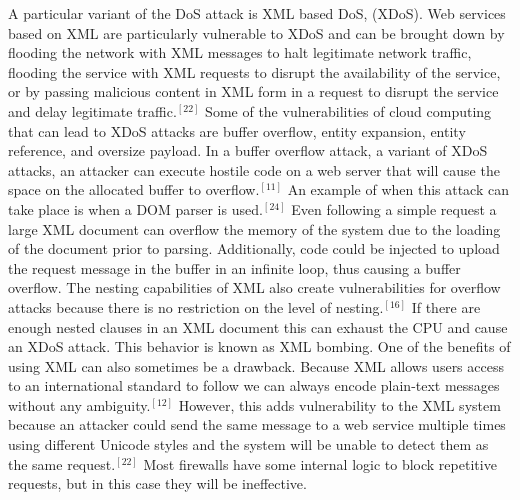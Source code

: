 \documentclass[a4paper, 8pt]{article} %
\begin{document}
\begin{doublespacing}
A particular variant of the DoS attack is XML based DoS, (XDoS).  Web services based on XML are particularly vulnerable to XDoS and can be brought down by flooding the network with XML messages to halt legitimate network traffic, flooding the service with XML requests to disrupt the availability of the service, or by passing malicious content in XML form in a request to disrupt the service and delay legitimate traffic.$^{[22]}$  Some of the vulnerabilities of cloud computing that can lead to XDoS attacks are buffer overflow, entity expansion, entity reference, and oversize payload.  In a buffer overflow attack, a variant of XDoS attacks, an attacker can execute hostile code on a web server that will cause the space on the allocated buffer to overflow.$^{[11]}$  An example of when this attack can take place is when a DOM parser is used.$^{[24]}$  Even following a simple request a large XML document can overflow the memory of the system due to the loading of the document prior to parsing.  Additionally, code could be injected to upload the request message in the buffer in an infinite loop, thus causing a buffer overflow.  The nesting capabilities of XML also create vulnerabilities for overflow attacks because there is no restriction on the level of nesting.$^{[16]}$  If there are enough nested clauses in an XML document this can exhaust the CPU and cause an XDoS attack.  This behavior is known as XML bombing.  One of the benefits of using XML can also sometimes be a drawback.  Because XML allows users access to an international standard to follow we can always encode plain-text messages without any ambiguity.$^{[12]}$  However, this adds vulnerability to the XML system because an attacker could send the same message to a web service multiple times using different Unicode styles and the system will be unable to detect them as the same request.$^{[22]}$  Most firewalls have some internal logic to block repetitive requests, but in this case they will be ineffective.  


\end{doublespacing}
\end{document}
